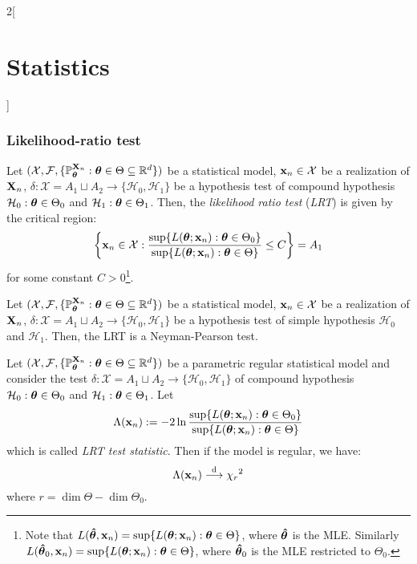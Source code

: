 \documentclass[../../../main_math.tex]{subfiles}
\begin{document}
\begin{multicols}{2}[\section{Statistics}]
  \subsubsection{Likelihood-ratio test}
  \begin{definition}
    Let $(\mathcal{X},\mathcal{F},\{\mathbb{P}_{\boldsymbol{\mathrm{\theta}}}^{\boldsymbol{\mathrm{X}}_n}:{\boldsymbol{\mathrm{\theta}}}\in\Theta\subseteq\mathbb{R}^d\})$ be a statistical model, $\boldsymbol{\mathrm{x}}_n\in\mathcal{X}$ be a realization of $\boldsymbol{\mathrm{X}}_n$, $\delta:\mathcal{X}=A_1\sqcup A_2\rightarrow\{\mathcal{H}_0,\mathcal{H}_1\}$ be a hypothesis test of compound hypothesis $\mathcal{H}_0:{\boldsymbol{\mathrm{\theta}}}\in\Theta_0$ and $\mathcal{H}_1:{\boldsymbol{\mathrm{\theta}}}\in\Theta_1$.
    Then, the \emph{likelihood ratio test} (\emph{LRT}) is given by the critical region:
    $$\left\{\boldsymbol{\mathrm{x}}_n\in\mathcal{X}:\frac{\sup\{L({\boldsymbol{\mathrm{\theta}}};\boldsymbol{\mathrm{x}}_n):{\boldsymbol{\mathrm{\theta}}}\in\Theta_0\}}{\sup\{L({\boldsymbol{\mathrm{\theta}}};\boldsymbol{\mathrm{x}}_n):{\boldsymbol{\mathrm{\theta}}}\in\Theta\}}\leq C\right\}= A_1$$
    for some constant $C>0$\footnote{Note that $L({\boldsymbol{\mathrm{\hat\theta}}},\boldsymbol{\mathrm{x}}_n)=\sup\{L({\boldsymbol{\mathrm{\theta}}};\boldsymbol{\mathrm{x}}_n):{\boldsymbol{\mathrm{\theta}}}\in\Theta\}$, where ${\boldsymbol{\mathrm{\hat\theta}}}$ is the MLE. Similarly $L({\boldsymbol{\mathrm{\hat\theta}}}_0,\boldsymbol{\mathrm{x}}_n)=\sup\{L({\boldsymbol{\mathrm{\theta}}};\boldsymbol{\mathrm{x}}_n):{\boldsymbol{\mathrm{\theta}}}\in\Theta\}$, where ${\boldsymbol{\mathrm{\hat\theta}}}_0$ is the MLE restricted to $\Theta_0$.}.
  \end{definition}
  \begin{proposition}
    Let $(\mathcal{X},\mathcal{F},\{\mathbb{P}_{\boldsymbol{\mathrm{\theta}}}^{\boldsymbol{\mathrm{X}}_n}:{\boldsymbol{\mathrm{\theta}}}\in\Theta\subseteq\mathbb{R}^d\})$ be a statistical model, $\boldsymbol{\mathrm{x}}_n\in\mathcal{X}$ be a realization of $\boldsymbol{\mathrm{X}}_n$, $\delta:\mathcal{X}=A_1\sqcup A_2\rightarrow\{\mathcal{H}_0,\mathcal{H}_1\}$ be a hypothesis test of simple hypothesis $\mathcal{H}_0$ and $\mathcal{H}_1$. Then, the LRT is a Neyman-Pearson test.
  \end{proposition}
  \begin{theorem}
    Let $(\mathcal{X},\mathcal{F},\{\mathbb{P}_{\boldsymbol{\mathrm{\theta}}}^{\boldsymbol{\mathrm{X}}_n}:{\boldsymbol{\mathrm{\theta}}}\in\Theta\subseteq\mathbb{R}^d\})$ be a parametric regular statistical model and consider the test $\delta:\mathcal{X}=A_1\sqcup A_2\rightarrow\{\mathcal{H}_0,\mathcal{H}_1\}$ of compound hypothesis $\mathcal{H}_0:{\boldsymbol{\mathrm{\theta}}}\in\Theta_0$ and $\mathcal{H}_1:{\boldsymbol{\mathrm{\theta}}}\in\Theta_1$. Let $$\Lambda(\boldsymbol{\mathrm{x}}_n):=-2\ln \frac{\sup\{L({\boldsymbol{\mathrm{\theta}}};\boldsymbol{\mathrm{x}}_n):{\boldsymbol{\mathrm{\theta}}}\in\Theta_0\}}{\sup\{L({\boldsymbol{\mathrm{\theta}}};\boldsymbol{\mathrm{x}}_n):{\boldsymbol{\mathrm{\theta}}}\in\Theta\}}$$ which is called \emph{LRT test statistic}. Then if the model is regular, we have:
    $$\Lambda(\boldsymbol{\mathrm{x}}_n)\overset{\text{d}}{\longrightarrow}{\chi_r}^2$$ where $r=\dim\Theta-\dim\Theta_0$.

\end{theorem}
\end{multicols}
\end{document}
